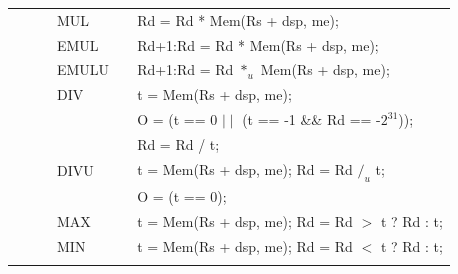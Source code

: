 \begin{table}
\begin{center}
\begin{tabular}{llllll}
                   &                   &                                       & MUL               & \flags{----}      & Rd = Rd * Mem(Rs + dsp, me);                                                  \\
                   &                   &                                       & EMUL              & \flags{----}      & Rd+1:Rd = Rd * Mem(Rs + dsp, me);                                             \\
                   &                   &                                       & EMULU             & \flags{----}      & Rd+1:Rd = Rd $*_u$ Mem(Rs + dsp, me);                                         \\
                   &                   &                                       & DIV               & \flags{!---}      & t = Mem(Rs + dsp, me);                                                        \\
                   &                   &                                       &                   &                   & O = (t == 0 $\mid\mid$ (t == -1 \&\& Rd == -$2^{31}$));                       \\
                   &                   &                                       &                   &                   & Rd = Rd / t;                                                                  \\
                   &                   &                                       & DIVU              & \flags{!---}      & t = Mem(Rs + dsp, me); Rd = Rd $/_u$ t;                                       \\
                   &                   &                                       &                   &                   & O = (t == 0);                                                                 \\
                   &                   &                                       & MAX               & \flags{----}      & t = Mem(Rs + dsp, me); Rd = Rd $>$ t ? Rd : t;                                \\
                   &                   &                                       & MIN               & \flags{----}      & t = Mem(Rs + dsp, me); Rd = Rd $<$ t ? Rd : t;                                \\
                   &                   &                                       &                   &                   &                                                                               \\

\end{tabular}
\end{center}
\end{table}
